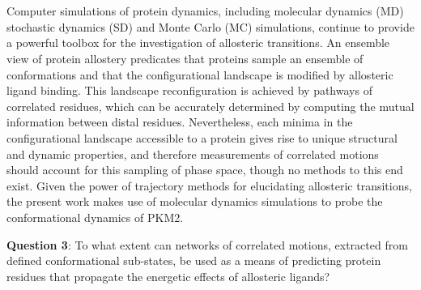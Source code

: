 %
%
\\\\
%
%
Computer simulations of protein dynamics, including molecular dynamics (MD) stochastic dynamics (SD) and Monte Carlo (MC) simulations, continue to provide a powerful toolbox for the investigation of allosteric transitions. An ensemble view of protein allostery \cite{Motlagh:2014aa} predicates that proteins sample an ensemble of conformations and that the configurational landscape is modified by allosteric ligand binding. This landscape reconfiguration is achieved by pathways of correlated residues, which can be accurately determined by computing the mutual information between distal residues. Nevertheless, each minima in the configurational landscape accessible to a protein gives rise to unique structural and dynamic properties, and therefore measurements of correlated motions should account for this sampling of phase space, though no methods to this end exist. Given the power of trajectory methods for elucidating allosteric transitions, the present work makes use of molecular dynamics simulations to probe the conformational dynamics of PKM2.
%
%
\begin{tcolorbox}
\textbf{Question 3}: To what extent can networks of correlated motions, extracted from defined conformational sub-states, be used as a means of predicting protein residues that propagate the energetic effects of allosteric ligands?
\end{tcolorbox}

\clearpage


